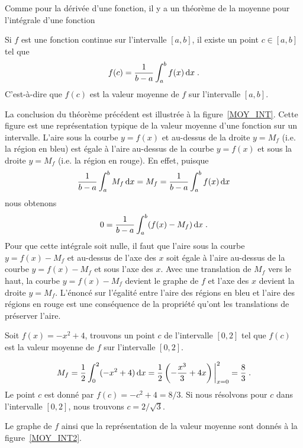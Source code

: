 {Comme pour la dérivée d'une fonction, il y a un théorème de la moyenne pour
l'intégrale d'une fonction

\begin{theorem}
Si $f$ est une fonction continue sur l'intervalle $[a,b]$, il existe un point
$c \in [a,b]$ tel que
\[
f(c) = \frac{1}{b-a} \int_a^b f(x) \,\mathrm{d}x \; .
\]
C'est-à-dire que $f(c)$ est la valeur moyenne de $f$ sur l'intervalle
$[a,b]$.
\end{theorem}

La conclusion du théorème précédent est illustrée à la figure~\ref{MOY_INT}.
Cette figure est une représentation typique de la valeur moyenne d'une
fonction sur un intervalle.  L'aire sous la courbe $y=f(x)$ et au-dessus de
la droite $y=M_f$ (i.e. la région en bleu) est égale à l'aire
au-dessus de la courbe $y=f(x)$ et sous la droite $y=M_f$ (i.e. la
région en rouge).  En effet, puisque
\[
\frac{1}{b-a} \int_a^b M_f \,\mathrm{d}x = M_f = \frac{1}{b-a}\int_a^b f(x) \,\mathrm{d}x
\]
nous obtenons
\[
0 = \frac{1}{b-a}\int_a^b (f(x)-M_f) \,\mathrm{d}x \; .
\]
Pour que cette intégrale soit nulle, il faut que l'aire sous la courbe
$y=f(x)-M_f$ et au-dessus de l'axe des $x$ soit égale à l'aire au-dessus de
la courbe $y=f(x)-M_f$ et sous l'axe des $x$.  Avec une translation de $M_f$
vers le haut, la courbe $y = f(x)-M_f$ devient le graphe de $f$ et
l'axe des $x$ devient la droite $y=M_f$.  L'énoncé sur l'égalité
entre l'aire des régions en bleu et l'aire des régions en rouge est
une conséquence de la propriété qu'ont les translations de préserver
l'aire.


\begin{egg}
Soit $f(x) = -x^2+4$, trouvons un point $c$ de l'intervalle $[0,2]$ tel que
$f(c)$ est la valeur moyenne de $f$ sur l'intervalle $[0,2]$.

\[
M_f = \frac{1}{2} \int_0^2 (-x^2+4) \,\mathrm{d}x
= \frac{1}{2} \left(-\frac{x^3}{3} + 4x\right)\bigg|_{x=0}^2
= \frac{8}{3} \; .
\]
Le point $c$ est donné par $f(c) = -c^2+4 = 8/3$.  Si nous résolvons
pour $c$ dans l'intervalle $[0,2]$, nous trouvons $c= 2/\sqrt{3}$.

Le graphe de $f$ ainsi que la représentation de la valeur moyenne sont donnés
à la figure~\ref{MOY_INT2}.
\end{egg}

}
